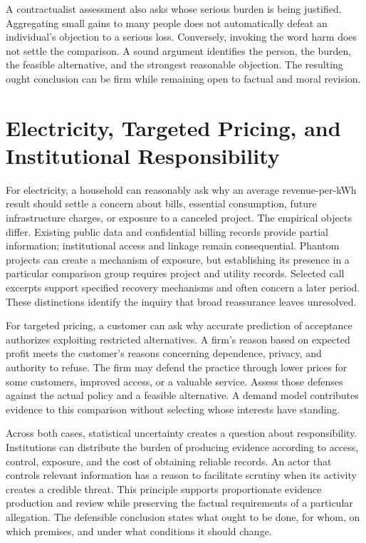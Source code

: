 A contractualist assessment also asks whose serious burden is being
justified. Aggregating small gains to many people does not automatically
defeat an individual's objection to a serious loss. Conversely, invoking
the word harm does not settle the comparison. A sound argument
identifies the person, the burden, the feasible alternative, and the
strongest reasonable objection. The resulting ought conclusion can be
firm while remaining open to factual and moral revision.


\hypertarget{M09-electricity-targeted-pricing-and-institutional-responsibility}{%
\section{Electricity, Targeted Pricing, and Institutional
Responsibility}\label{M09-electricity-targeted-pricing-and-institutional-responsibility}}

\noindent For electricity, a household can reasonably ask why an average
revenue-per-kWh result should settle a concern about bills, essential
consumption, future infrastructure charges, or exposure to a canceled
project. The empirical objects differ. Existing public data and
confidential billing records provide partial information; institutional
access and linkage remain consequential. Phantom projects can create a
mechanism of exposure, but establishing its presence in a particular
comparison group requires project and utility records. Selected call
excerpts support specified recovery mechanisms and often concern a later
period. These distinctions identify the inquiry that broad reassurance
leaves unresolved.

For targeted pricing, a customer can ask why accurate prediction of
acceptance authorizes exploiting restricted alternatives. A firm's
reason based on expected profit meets the customer's reasons concerning
dependence, privacy, and authority to refuse. The firm may defend the
practice through lower prices for some customers, improved access, or a
valuable service. Assess those defenses against the actual policy and a
feasible alternative. A demand model contributes evidence to this
comparison without selecting whose interests have standing.

Across both cases, statistical uncertainty creates a question about
responsibility. Institutions can distribute the burden of producing
evidence according to access, control, exposure, and the cost of
obtaining reliable records. An actor that controls relevant information
has a reason to facilitate scrutiny when its activity creates a credible
threat. This principle supports proportionate evidence production and
review while preserving the factual requirements of a particular
allegation. The defensible conclusion states what ought to be done, for
whom, on which premises, and under what conditions it should change.

